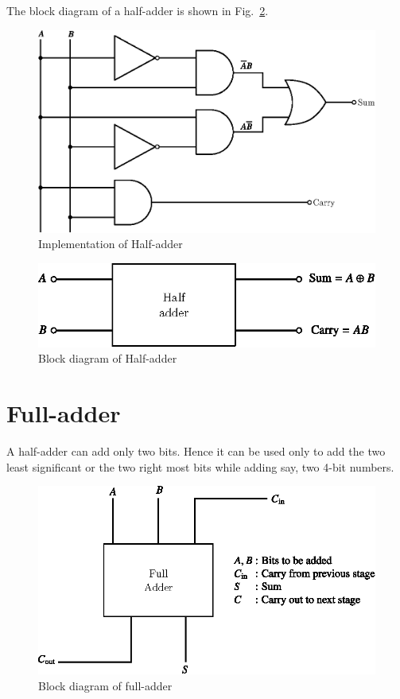 \noindent
\eject
The block diagram of a half-adder is shown in Fig.~\ref{fig6.29}.
\begin{figure}[H]
\centering
\includegraphics{chap6/fig127_6.28.eps}
\caption{Implementation of Half-adder}\label{fig6.28}
\end{figure}
\begin{figure}[H]
\centering
\includegraphics{chap6/fig128_6.29.eps}
\caption{Block diagram of Half-adder}\label{fig6.29}
\end{figure}

\section{Full-adder}\label{sec6.31}

A half-adder can add only two bits. Hence it can be used only to add the two least significant or the two right most bits while adding say, two 4-bit numbers.
\begin{figure}[H]
\centering
\includegraphics{chap6/fig129_6.30.eps}
\caption{Block diagram of full-adder}\label{fig6.30}
\end{figure}


